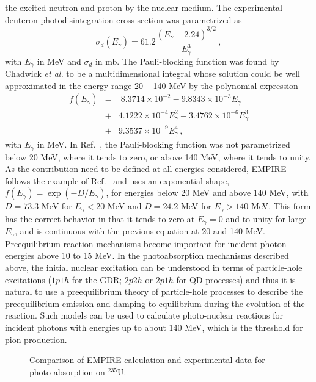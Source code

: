 \documentclass[twocolumn,amsmath,amssymb,10pt,groupedaddress,letter]{revtex4}
\begin{document}
the excited neutron and proton by the nuclear medium. The experimental
deuteron photodisintegration cross section was parametrized as
\begin{equation}
\sigma_{d}(E_{\gamma})=61.2\frac{(E_{\gamma}-2.24)^{3/2}}{E_{\gamma}^{3}}\,,
\end{equation}
with $E_{\gamma}$ in MeV and $\sigma_{d}$ in mb. The Pauli-blocking
function was found by Chadwick \emph{et al.} to be a multidimensional
integral whose solution could be well approximated in the energy range
20 -- 140 MeV by the polynomial expression
\begin{eqnarray}
f(E_{\gamma}) & = & \;8.3714\times10^{-2}-9.8343\times10^{-3}E_{\gamma}\nonumber\\
&+&4.1222\times10^{-4}E_{\gamma}^{2} -3.4762\times10^{-6}E_{\gamma}^{3}\nonumber\\
&+&9.3537\times10^{-9}E_{\gamma}^{4}\,,
\end{eqnarray}
with $E_{\gamma}$ in MeV. In Ref.~\cite{chadQD}, the Pauli-blocking
function was not parametrized below 20 MeV, where it tends to zero,
or above 140 MeV, where it tends to unity. As the contribution need
to be defined at all energies considered, EMPIRE follows the example
of Ref.~\cite{PHNuc} and uses an exponential shape, $f(E_{\gamma})=\exp(-D/E_{\gamma})$,
for energies below 20 MeV and above 140 MeV, with $D=73.3$ MeV for
$E_{\gamma}<20$ MeV and $D=24.2$ MeV for $E_{\gamma}>140$ MeV.
This form has the correct behavior in that it tends to zero at $E_{\gamma}=0$
and to unity for large $E_{\gamma}$, and is continuous with the previous
equation at 20 and 140 MeV.
Preequilibrium reaction mechanisms become important for incident photon
energies above 10 to 15 MeV. In the photoabsorption mechanisms described
above, the initial nuclear excitation can be understood in terms of
particle-hole excitations ($1p1h$ for the GDR; $2p2h$ or $2p1h$
for QD processes) and thus it is natural to use a preequilibrium theory
of particle-hole processes to describe the preequilibrium emission
and damping to equilibrium during the evolution of the reaction. Such
models can be used to calculate photo-nuclear reactions for incident
photons with energies up to about 140 MeV, which is the threshold
for pion production.
\begin{figure}[htbp]
\caption{Comparison of EMPIRE calculation and experimental data for
photo-absorption on $^{235}$U.}
\label{u235abs}
\end{figure}
\end{document}
